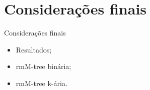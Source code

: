 \section{Considerações finais}
\begin{frame}{Considerações finais}
	\begin{itemize}
        \item Resultados;
        \item rmM-tree binária;
        \item rmM-tree k-ária.
    \end{itemize}
\end{frame}
